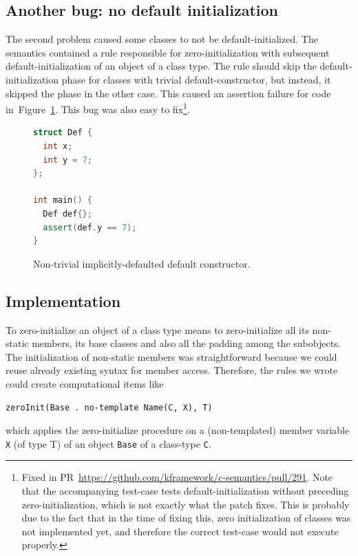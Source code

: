 \documentclass[nolot,nolof,nocover,printed]{fithesis3}
\begin{document}
\subsection{Another bug: no default initialization}

The second problem caused some classes to not be default-initialized. The semantics contained a rule responsible for zero-initialization with subsequent default-initialization of an object of a class type. The rule should skip the default-initialization phase for classes with trivial default-constructor, but instead, it skipped the phase in the other case. This caused an assertion failure for code in~Figure~\ref{fig:defaultCtor}. This bug was also easy to fix\footnote{Fixed in PR~\url{https://github.com/kframework/c-semantics/pull/291}. Note that the accompanying test-case tests default-initialization without preceding zero-initialization, which is not exactly what the patch fixes. This is probably due to the fact that in the time of fixing this, zero initialization of classes was not implemented yet, and therefore the correct test-case would not execute properly.}.

\begin{figure}[ht]
\begin{lstlisting}[language=c++]
struct Def {
  int x;
  int y = 7;
};

int main() {
  Def def{};
  assert(def.y == 7);
}
\end{lstlisting}
\caption{Non-trivial implicitly-defaulted default constructor.}
\label{fig:defaultCtor}
\end{figure}

\subsection{Implementation}

To zero-initialize an object of a class type means to zero-initialize all its non-static members, its base classes and also all the padding among the subobjects. The initialization of non-static members was straightforward because we could reuse already existing syntax for member access. Therefore, the rules we wrote could create computational items like
\begin{lstlisting}
zeroInit(Base . no-template Name(C, X), T)
\end{lstlisting}
which applies the zero-initialize procedure on a (non-templated) member variable \texttt{X} (of type T) of an object \texttt{Base} of a class-type \texttt{C}.
\end{document}
